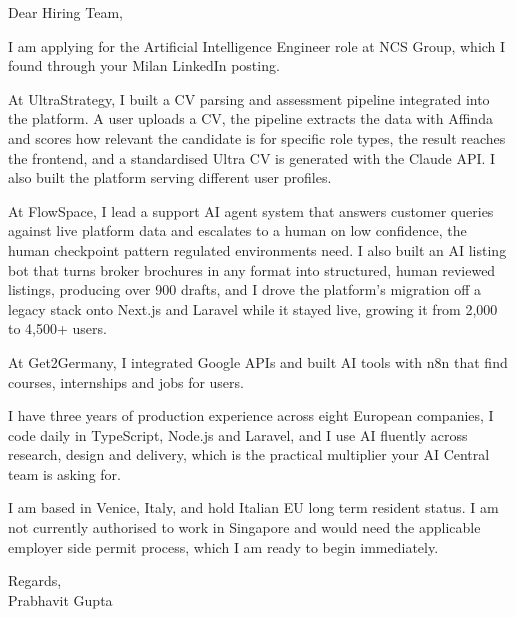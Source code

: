 \documentclass[a4paper,11pt]{article}
\begin{document}
Dear Hiring Team,

I am applying for the Artificial Intelligence Engineer role at NCS Group, which I found through your Milan LinkedIn posting.

At UltraStrategy, I built a CV parsing and assessment pipeline integrated into the platform. A user uploads a CV, the pipeline extracts the data with Affinda and scores how relevant the candidate is for specific role types, the result reaches the frontend, and a standardised Ultra CV is generated with the Claude API. I also built the platform serving different user profiles.

At FlowSpace, I lead a support AI agent system that answers customer queries against live platform data and escalates to a human on low confidence, the human checkpoint pattern regulated environments need. I also built an AI listing bot that turns broker brochures in any format into structured, human reviewed listings, producing over 900 drafts, and I drove the platform's migration off a legacy stack onto Next.js and Laravel while it stayed live, growing it from 2,000 to 4,500+ users.

At Get2Germany, I integrated Google APIs and built AI tools with n8n that find courses, internships and jobs for users.

I have three years of production experience across eight European companies, I code daily in TypeScript, Node.js and Laravel, and I use AI fluently across research, design and delivery, which is the practical multiplier your AI Central team is asking for.

I am based in Venice, Italy, and hold Italian EU long term resident status. I am not currently authorised to work in Singapore and would need the applicable employer side permit process, which I am ready to begin immediately.

Regards,\\
Prabhavit Gupta
\end{document}
